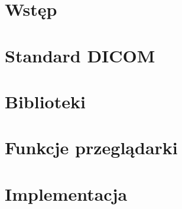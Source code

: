 \chapter{Wstęp}


\chapter{Standard DICOM}

\chapter{Biblioteki}

\chapter{Funkcje przeglądarki}

\chapter{Implementacja}

